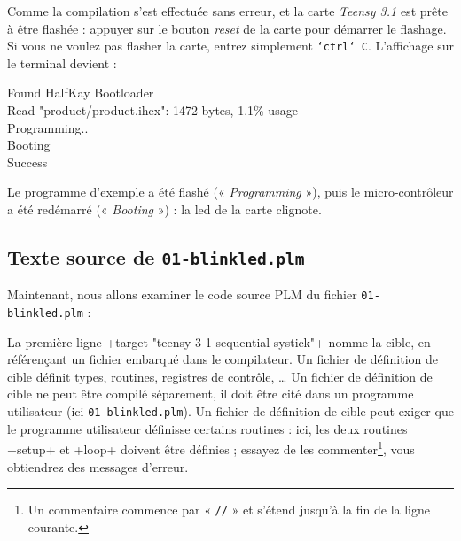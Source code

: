Comme la compilation s'est effectuée sans erreur, et la carte \emph{Teensy 3.1} est prête à être flashée : appuyer sur le bouton \emph{reset} de la carte pour démarrer le flashage. Si vous ne voulez pas flasher la carte, entrez simplement \texttt{`ctrl`~C}. L'affichage sur le terminal devient :
\begin{SHELL}
Found HalfKay Bootloader\\
Read "product/product.ihex": 1472 bytes, 1.1\% usage\\
Programming..\\
Booting\\
Success
\end{SHELL}

Le programme d'exemple a été flashé (« \emph{Programming} »), puis le micro-contrôleur a été redémarré (« \emph{Booting} ») : la led de la carte clignote.

\subsection{Texte source de \texttt{01-blinkled.plm}}

Maintenant, nous allons examiner le code source PLM du fichier \texttt{01-blinkled.plm} :


La première ligne \plm+target "teensy-3-1-sequential-systick"+ nomme la cible, en référençant un fichier embarqué dans le compilateur. Un fichier de définition de cible définit types, routines, registres de contrôle, … Un fichier de définition de cible ne peut être compilé séparement, il doit être cité dans un programme utilisateur (ici \texttt{01-blinkled.plm}). Un fichier de définition de cible peut exiger que le programme utilisateur définisse certains routines : ici, les deux routines \plm+setup+ et \plm+loop+ doivent être définies ; essayez de les commenter\footnote{Un commentaire commence par « \texttt{//} » et s'étend jusqu'à la fin de la ligne courante.}, vous obtiendrez des messages d'erreur.


